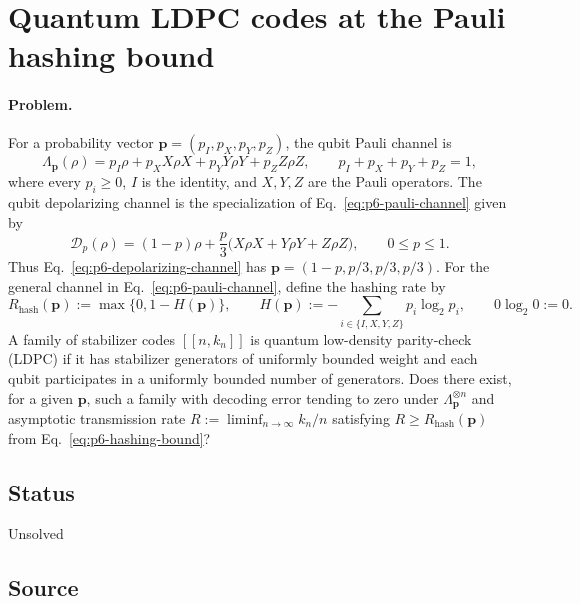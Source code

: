 \section{Quantum LDPC codes at the Pauli hashing bound}
\label{sec:problem-6}

\paragraph{Problem.}
For a probability vector $\mathbf p=(p_I,p_X,p_Y,p_Z)$, the qubit Pauli
channel is
\begin{equation}
  \Lambda_{\mathbf p}(\rho)
  =p_I\rho+p_XX\rho X+p_YY\rho Y+p_ZZ\rho Z,
  \qquad p_I+p_X+p_Y+p_Z=1,
  \label{eq:p6-pauli-channel}
\end{equation}
where every $p_i\ge0$, $I$ is the identity, and $X,Y,Z$ are the Pauli
operators.  The qubit depolarizing channel is the specialization of
Eq.~\eqref{eq:p6-pauli-channel} given by
\begin{equation}
  \mathcal D_p(\rho)
  =(1-p)\rho+\frac p3\bigl(X\rho X+Y\rho Y+Z\rho Z\bigr),
  \qquad 0\le p\le1.
  \label{eq:p6-depolarizing-channel}
\end{equation}
Thus Eq.~\eqref{eq:p6-depolarizing-channel} has
$\mathbf p=(1-p,p/3,p/3,p/3)$.  For the general channel in
Eq.~\eqref{eq:p6-pauli-channel}, define the hashing rate by
\begin{equation}
  R_{\mathrm{hash}}(\mathbf p)
  :=\max\{0,1-H(\mathbf p)\},
  \qquad
  H(\mathbf p):=-\sum_{i\in\{I,X,Y,Z\}}p_i\log_2p_i,
  \qquad 0\log_2 0:=0.
  \label{eq:p6-hashing-bound}
\end{equation}
A family of stabilizer codes $[[n,k_n]]$ is quantum low-density parity-check
(LDPC) if it has stabilizer generators of uniformly bounded weight and each
qubit participates in a uniformly bounded number of generators.  Does there
exist, for a given $\mathbf p$, such a family with decoding error tending to
zero under $\Lambda_{\mathbf p}^{\otimes n}$ and asymptotic transmission rate
$R:=\liminf_{n\to\infty}k_n/n$ satisfying
$R\ge R_{\mathrm{hash}}(\mathbf p)$ from
Eq.~\eqref{eq:p6-hashing-bound}?

\subsection*{Status}

Unsolved

\subsection*{Source}

